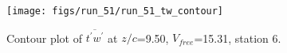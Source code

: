 \begin{figure}[H]
\centering
\texttt{[image: figs/run\_51/run\_51\_tw\_contour]}
\caption{Contour plot of $\overline{t^\prime w^\prime}$ at $z/c$=9.50, $V_{free}$=15.31, station 6.}
\end{figure}


